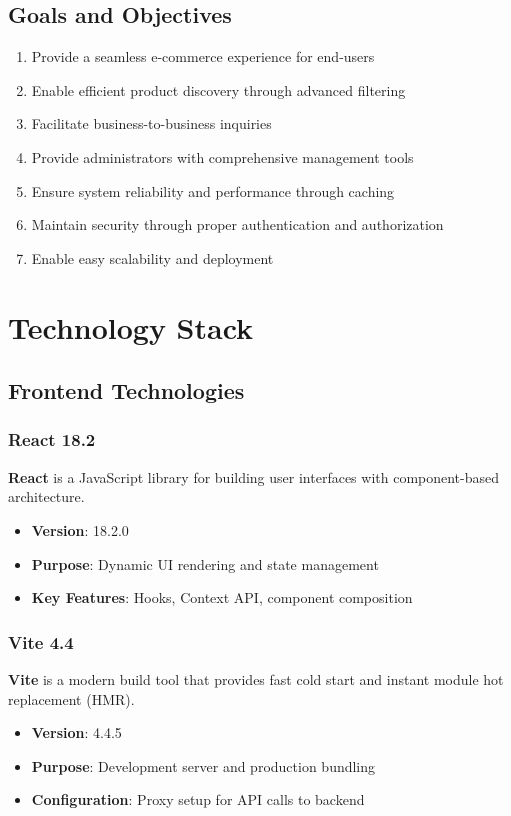 \documentclass[12pt,a4paper]{report}
\begin{document}
\section{Goals and Objectives}

\begin{enumerate}
    \item Provide a seamless e-commerce experience for end-users
    \item Enable efficient product discovery through advanced filtering
    \item Facilitate business-to-business inquiries
    \item Provide administrators with comprehensive management tools
    \item Ensure system reliability and performance through caching
    \item Maintain security through proper authentication and authorization
    \item Enable easy scalability and deployment
\end{enumerate}

\newpage

\chapter{Technology Stack}

\section{Frontend Technologies}

\subsection{React 18.2}
\textbf{React} is a JavaScript library for building user interfaces with component-based architecture.
\begin{itemize}
    \item \textbf{Version}: 18.2.0
    \item \textbf{Purpose}: Dynamic UI rendering and state management
    \item \textbf{Key Features}: Hooks, Context API, component composition
\end{itemize}

\subsection{Vite 4.4}
\textbf{Vite} is a modern build tool that provides fast cold start and instant module hot replacement (HMR).
\begin{itemize}
    \item \textbf{Version}: 4.4.5
    \item \textbf{Purpose}: Development server and production bundling
    \item \textbf{Configuration}: Proxy setup for API calls to backend
\end{itemize}
\end{document}
